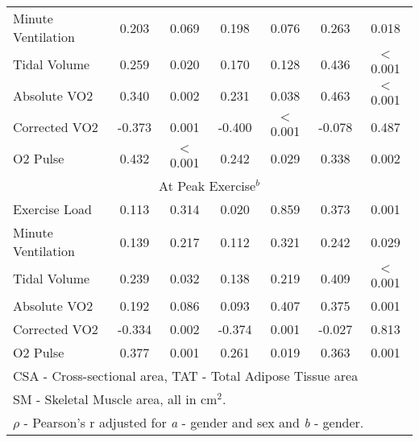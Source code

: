 \begin{table}[p]
\begin{tabular}{|l | c c | c c | c c|}
		Minute Ventilation & 0.203  & 0.069            & 0.198  & 0.076            & 0.263  & 0.018                \\
		Tidal Volume       & 0.259  & 0.020            & 0.170  & 0.128            & 0.436  & $<$0.001             \\
		Absolute VO2       & 0.340  & 0.002            & 0.231  & 0.038            & 0.463  & $<$0.001             \\
		Corrected VO2      & -0.373 & 0.001            & -0.400 & $<$0.001         & -0.078 & 0.487                \\
		O2 Pulse           & 0.432  & $<$0.001         & 0.242  & 0.029            & 0.338  & 0.002                \\ \hline
		\multicolumn{7}{|c|}{At Peak Exercise$^b$}                                                                 \\ \hline
		Exercise Load      & 0.113  & 0.314            & 0.020  & 0.859            & 0.373  & 0.001                \\
		Minute Ventilation & 0.139  & 0.217            & 0.112  & 0.321            & 0.242  & 0.029                \\
		Tidal Volume       & 0.239  & 0.032            & 0.138  & 0.219            & 0.409  & $<$0.001             \\
		Absolute VO2       & 0.192  & 0.086            & 0.093  & 0.407            & 0.375  & 0.001                \\
		Corrected VO2      & -0.334 & 0.002            & -0.374 & 0.001            & -0.027 & 0.813                \\
		O2 Pulse           & 0.377  & 0.001            & 0.261  & 0.019            & 0.363  & 0.001                \\ \hline
		\multicolumn{7}{l}{CSA - Cross-sectional area, TAT - Total Adipose Tissue area}                            \\
		\multicolumn{7}{l}{SM - Skeletal Muscle area, all in cm$^2$.}                                              \\
		\multicolumn{7}{l}{$\rho$ - Pearson's r adjusted for \textit{a} - gender and sex and \textit{b} - gender.}
	\end{tabular}
\end{table}
